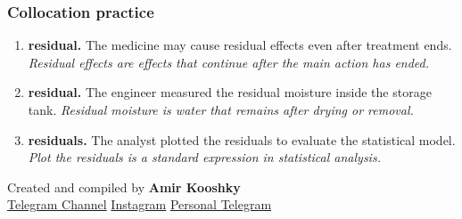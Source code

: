 \documentclass[11pt]{article}
\begin{document}
\subsubsection{Collocation practice}
\begin{enumerate}
  \item \textbf{residual.} The medicine may cause residual effects even after treatment ends. \emph{Residual effects are effects that continue after the main action has ended.}
  \item \textbf{residual.} The engineer measured the residual moisture inside the storage tank. \emph{Residual moisture is water that remains after drying or removal.}
  \item \textbf{residuals.} The analyst plotted the residuals to evaluate the statistical model. \emph{Plot the residuals is a standard expression in statistical analysis.}
\end{enumerate}

\vfill
\begin{center}
\small\color{Muted} Created and compiled by \textbf{Amir Kooshky}\\
\href{https://t.me/KooshkyTOEFL}{Telegram Channel}\quad\textbullet\quad
\href{https://www.instagram.com/kooshkytoefl}{Instagram}\quad\textbullet\quad
\href{https://t.me/KooshkyTOEFL\_pv}{Personal Telegram}
\end{center}
\end{document}
